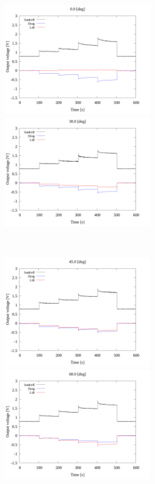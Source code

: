 \begin{figure}[htbp]
  \begin{minipage}[b]{0.45\linewidth}
    \centering
    \includegraphics[width=65mm]{../../02_workspace/result/2-1/plot/01-3_allsensors/01_allsensors_0.png}
  \end{minipage}
  \begin{minipage}[b]{0.45\linewidth}
    \centering
    \includegraphics[width=65mm]{../../02_workspace/result/2-1/plot/01-3_allsensors/01_allsensors_300.png}
  \end{minipage} \\
  \begin{minipage}[b]{0.45\linewidth}
    \centering
    \includegraphics[width=65mm]{../../02_workspace/result/2-1/plot/01-3_allsensors/01_allsensors_450.png}
  \end{minipage}
  \begin{minipage}[b]{0.45\linewidth}
    \centering
    \includegraphics[width=65mm]{../../02_workspace/result/2-1/plot/01-3_allsensors/01_allsensors_600.png}

\end{minipage}
\end{figure}

